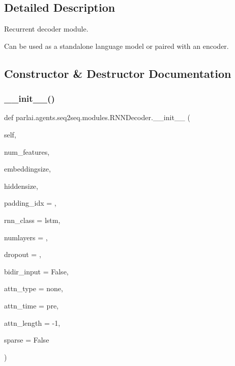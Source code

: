 \subsection{Detailed Description}
\begin{DoxyVerb}Recurrent decoder module.

Can be used as a standalone language model or paired with an encoder.
\end{DoxyVerb}
 

\subsection{Constructor \& Destructor Documentation}
\mbox{\label{classparlai_1_1agents_1_1seq2seq_1_1modules_1_1RNNDecoder_ac115797a89d673f99c26d1ed9fba6d30}} 
\subsubsection{\texorpdfstring{\+\_\+\+\_\+init\+\_\+\+\_\+()}{\_\_init\_\_()}}
{\footnotesize\ttfamily def parlai.\+agents.\+seq2seq.\+modules.\+R\+N\+N\+Decoder.\+\_\+\+\_\+init\+\_\+\+\_\+ (\begin{DoxyParamCaption}\item[{}]{self,  }\item[{}]{num\+\_\+features,  }\item[{}]{embeddingsize,  }\item[{}]{hiddensize,  }\item[{}]{padding\+\_\+idx = {},  }\item[{}]{rnn\+\_\+class = {\ttfamily \textquotesingle{}lstm\textquotesingle{}},  }\item[{}]{numlayers = {},  }\item[{}]{dropout = {},  }\item[{}]{bidir\+\_\+input = {\ttfamily False},  }\item[{}]{attn\+\_\+type = {\ttfamily \textquotesingle{}none\textquotesingle{}},  }\item[{}]{attn\+\_\+time = {\ttfamily \textquotesingle{}pre\textquotesingle{}},  }\item[{}]{attn\+\_\+length = {\ttfamily -\/1},  }\item[{}]{sparse = {\ttfamily False} }\end{DoxyParamCaption})}

